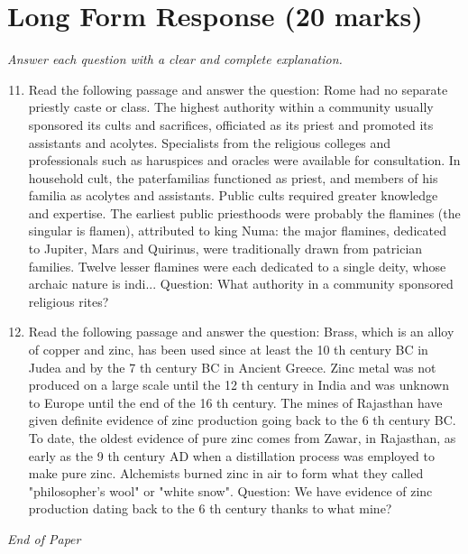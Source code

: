 \documentclass[12pt]{article}
\begin{document}
\section*{Long Form Response (20 marks)}
\textit{Answer each question with a clear and complete explanation.}
\begin{enumerate}[label=\arabic*.]
\setcounter{enumi}{10}
\item Read the following passage and answer the question: Rome had no separate priestly caste or class. The highest authority within a community usually sponsored its cults and sacrifices, officiated as its priest and promoted its assistants and acolytes. Specialists from the religious colleges and professionals such as haruspices and oracles were available for consultation. In household cult, the paterfamilias functioned as priest, and members of his familia as acolytes and assistants. Public cults required greater knowledge and expertise. The earliest public priesthoods were probably the flamines (the singular is flamen), attributed to king Numa: the major flamines, dedicated to Jupiter, Mars and Quirinus, were traditionally drawn from patrician families. Twelve lesser flamines were each dedicated to a single deity, whose archaic nature is indi... Question: What authority in a community sponsored religious rites?
\item Read the following passage and answer the question: Brass, which is an alloy of copper and zinc, has been used since at least the 10 th century BC in Judea and by the 7 th century BC in Ancient Greece. Zinc metal was not produced on a large scale until the 12 th century in India and was unknown to Europe until the end of the 16 th century. The mines of Rajasthan have given definite evidence of zinc production going back to the 6 th century BC. To date, the oldest evidence of pure zinc comes from Zawar, in Rajasthan, as early as the 9 th century AD when a distillation process was employed to make pure zinc. Alchemists burned zinc in air to form what they called "philosopher's wool" or "white snow". Question: We have evidence of zinc production dating back to the 6 th century thanks to what mine?
\end{enumerate}

\vfill
\noindent\textit{End of Paper}
\end{document}
